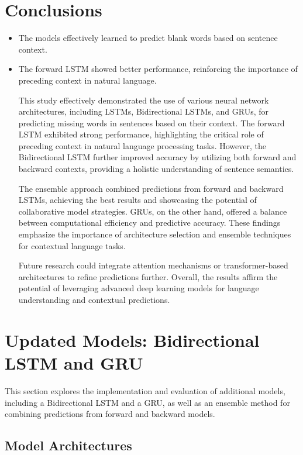 \documentclass{article}
\begin{document}
\section{Conclusions}
\begin{itemize}
    \item The models effectively learned to predict blank words based on sentence context.
    \item The forward LSTM showed better performance, reinforcing the importance of preceding context in natural language.

This study effectively demonstrated the use of various neural network architectures, including LSTMs, Bidirectional LSTMs, and GRUs, for predicting missing words in sentences based on their context. The forward LSTM exhibited strong performance, highlighting the critical role of preceding context in natural language processing tasks. However, the Bidirectional LSTM further improved accuracy by utilizing both forward and backward contexts, providing a holistic understanding of sentence semantics. 

The ensemble approach combined predictions from forward and backward LSTMs, achieving the best results and showcasing the potential of collaborative model strategies. GRUs, on the other hand, offered a balance between computational efficiency and predictive accuracy. These findings emphasize the importance of architecture selection and ensemble techniques for contextual language tasks.

Future research could integrate attention mechanisms or transformer-based architectures to refine predictions further. Overall, the results affirm the potential of leveraging advanced deep learning models for language understanding and contextual predictions.

\end{itemize}






\section{Updated Models: Bidirectional LSTM and GRU}

This section explores the implementation and evaluation of additional models, including a Bidirectional LSTM and a GRU, as well as an ensemble method for combining predictions from forward and backward models.

\subsection{Model Architectures}
\end{document}

